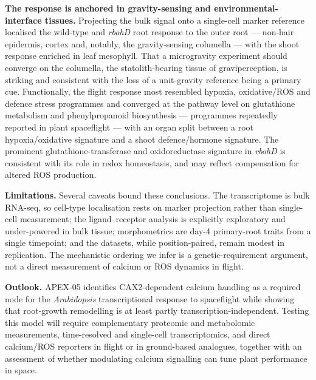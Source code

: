 \documentclass[pdflatex,sn-nature]{sn-jnl}
\begin{document}
\textbf{The response is anchored in gravity-sensing and environmental-interface
tissues.} Projecting the bulk signal onto a single-cell marker reference localised the
wild-type and \textit{rbohD} root response to the outer root --- non-hair epidermis,
cortex and, notably, the gravity-sensing columella --- with the shoot response enriched
in leaf mesophyll. That a microgravity experiment should converge on the columella, the
statolith-bearing tissue of graviperception, is striking and consistent with the loss
of a unit-gravity reference being a primary cue. Functionally, the flight response most
resembled hypoxia, oxidative/ROS and defence stress programmes and converged at the
pathway level on glutathione metabolism and phenylpropanoid biosynthesis --- programmes
repeatedly reported in plant spaceflight \cite{barker2023} --- with an organ split
between a root hypoxia/oxidative signature and a shoot defence/hormone signature. The
prominent glutathione-transferase and oxidoreductase signature in \textit{rbohD} is
consistent with its role in redox homeostasis, and may reflect compensation for altered
ROS production.

\textbf{Limitations.} Several caveats bound these conclusions. The transcriptome is
bulk RNA-seq, so cell-type localisation rests on marker projection rather than
single-cell measurement; the ligand--receptor analysis is explicitly exploratory and
under-powered in bulk tissue; morphometrics are day-4 primary-root traits from a single
timepoint; and the datasets, while position-paired, remain modest in replication. The
mechanistic ordering we infer is a genetic-requirement argument, not a direct
measurement of calcium or ROS dynamics in flight.

\textbf{Outlook.} APEX-05 identifies CAX2-dependent calcium handling as a required node
for the \textit{Arabidopsis} transcriptional response to spaceflight while showing that
root-growth remodelling is at least partly transcription-independent. Testing this model
will require complementary proteomic and metabolomic measurements, time-resolved and
single-cell transcriptomics, and direct calcium/ROS reporters in flight or in
ground-based analogues, together with an assessment of whether modulating calcium
signalling can tune plant performance in space.
\end{document}
